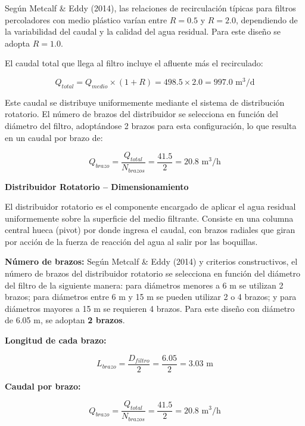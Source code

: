 \documentclass[12pt,a4paper]{article}
\begin{document}
Según Metcalf \& Eddy (2014), las relaciones de recirculación típicas para filtros percoladores con medio plástico varían entre $R = 0.5$ y $R = 2.0$, dependiendo de la variabilidad del caudal y la calidad del agua residual. Para este diseño se adopta $R = 1.0$.

El caudal total que llega al filtro incluye el afluente más el recirculado:

\begin{equation}
Q_{total} = Q_{medio} \times (1 + R) = 498.5 \times 2.0 = 997.0 \text{ m}^3\text{/d}
\end{equation}

Este caudal se distribuye uniformemente mediante el sistema de distribución rotatorio. El número de brazos del distribuidor se selecciona en función del diámetro del filtro, adoptándose 2 brazos para esta configuración, lo que resulta en un caudal por brazo de:

\begin{equation}
Q_{brazo} = \frac{Q_{total}}{N_{brazos}} = \frac{41.5}{2} = 20.8 \text{ m}^3\text{/h}
\end{equation}

\textbf{Distribuidor Rotatorio -- Dimensionamiento}

El distribuidor rotatorio es el componente encargado de aplicar el agua residual uniformemente sobre la superficie del medio filtrante. Consiste en una columna central hueca (pivot) por donde ingresa el caudal, con brazos radiales que giran por acción de la fuerza de reacción del agua al salir por las boquillas.

\textbf{Número de brazos:} Según Metcalf \& Eddy (2014) y criterios constructivos, el número de brazos del distribuidor rotatorio se selecciona en función del diámetro del filtro de la siguiente manera: para diámetros menores a 6 m se utilizan 2 brazos; para diámetros entre 6 m y 15 m se pueden utilizar 2 o 4 brazos; y para diámetros mayores a 15 m se requieren 4 brazos. Para este diseño con diámetro de 6.05 m, se adoptan \textbf{2 brazos}.

\textbf{Longitud de cada brazo:}

\begin{equation}
L_{brazo} = \frac{D_{filtro}}{2} = \frac{6.05}{2} = 3.03 \text{ m}
\end{equation}

\textbf{Caudal por brazo:}

\begin{equation}
Q_{brazo} = \frac{Q_{total}}{N_{brazos}} = \frac{41.5}{2} = 20.8 \text{ m}^3\text{/h}
\end{equation}
\end{document}
